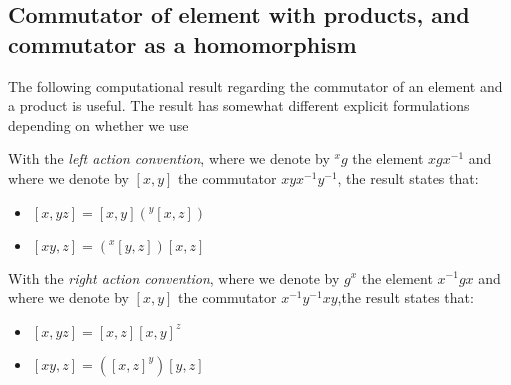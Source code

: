 \subsection{Commutator of element with products, and commutator as a homomorphism}

The following computational result regarding the commutator of an
element and a product is useful. The result has somewhat different explicit formulations depending on whether we use 

With the {\em left action convention}, where we denote by ${}^xg$ the
element $xgx^{-1}$ and where we denote by $[x,y]$ the commutator
$xyx^{-1}y^{-1}$, the result states that:

\begin{itemize}
\item $[x,yz] = [x,y](^y[x,z])$
\item $[xy,z] = ({}^x[y,z])[x,z]$
\end{itemize}

With the {\em right action convention}, where we denote by $g^x$ the
element $x^{-1}gx$ and where we denote by $[x,y]$ the commutator
$x^{-1}y^{-1}xy$,the result states that:

\begin{itemize}
\item $[x,yz] = [x,z][x,y]^z$
\item $[xy,z] = ([x,z]^y)[y,z]$
\end{itemize}

